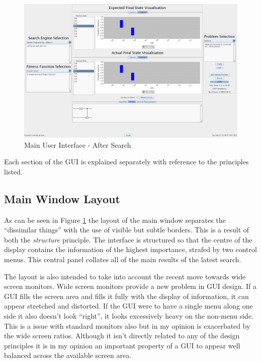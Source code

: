 \begin{figure}
 \includegraphics[width=\textwidth]{GUIDesign.png}
\caption{Main User Interface - After Search}
\label{fig:MainGUIDesign}
\end{figure}

Each section of the GUI is explained separately with reference to the principles listed.

\subsection{Main Window Layout}
As can be seen in Figure \ref{fig:MainGUIDesign} the layout of the main window separates the ``dissimilar things'' with the use of visible but subtle borders.
This is a result of both the \emph{structure} principle.
The interface is structured so that the centre of the display contains the information of the highest importance, strafed by two control menus.
This central panel collates all of the main results of the latest search.

The layout is also intended to take into account the recent move towards wide screen monitors.
Wide screen monitors provide a new problem in GUI design.
If a GUI fills the screen area and fills it fully with the display of information, it can appear stretched and distorted.
If the GUI were to have a single menu along one side it also doesn't look ``right'', it looks excessively heavy on the non-menu side.
This is a issue with standard monitors also but in my opinion is exacerbated by the wide screen ratios.
Although it isn't directly related to any of the design principles it is in my opinion an important property of a GUI to appear well balanced across the available screen area.

